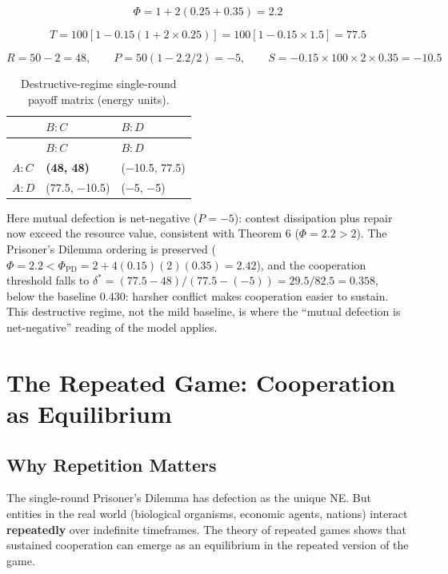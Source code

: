 \documentclass[11pt]{article}
\theoremstyle{plain}
\theoremstyle{definition}
\theoremstyle{remark}
\let\origsection\section
\renewcommand{\section}{\needspace{12\baselineskip}\origsection}
\let\origsubsection\subsection
\renewcommand{\subsection}{\needspace{7\baselineskip}\origsubsection}
\begin{document}
\[\Phi = 1 + 2(0.25 + 0.35) = 2.2\]

\[T = 100[1 - 0.15(1 + 2 \times 0.25)] = 100[1 - 0.15 \times 1.5] = 77.5\]

\[R = 50 - 2 = 48, \qquad P = 50(1 - 2.2/2) = -5, \qquad S = -0.15 \times 100 \times 2 \times 0.35 = -10.5\]

\begin{longtable}[]{@{}lll@{}}
\caption{Destructive-regime single-round payoff matrix (energy
units).}\tabularnewline
\toprule\noalign{}
& \(B: C\) & \(B: D\) \\
\midrule\noalign{}
\endfirsthead
\toprule\noalign{}
& \(B: C\) & \(B: D\) \\
\midrule\noalign{}
\endhead
\bottomrule\noalign{}
\endlastfoot
\(A: C\) & \textbf{(48, 48)} & (−10.5, 77.5) \\
\(A: D\) & (77.5, −10.5) & (−5, −5) \\
\end{longtable}

Here mutual defection is net-negative (\(P = -5\)): contest dissipation
plus repair now exceed the resource value, consistent with Theorem 6
\citep{TC-IV} (\(\Phi = 2.2 > 2\)). The Prisoner's Dilemma ordering is
preserved
(\(\Phi = 2.2 < \Phi_{\text{PD}} = 2 + 4(0.15)(2)(0.35) = 2.42\)), and
the cooperation threshold falls to
\(\delta^* = (77.5 - 48)/(77.5 - (-5)) = 29.5/82.5 = 0.358\), below the
baseline \(0.430\): harsher conflict makes cooperation easier to
sustain. This destructive regime, not the mild baseline, is where the
``mutual defection is net-negative'' reading of the model applies.

\section{The Repeated Game: Cooperation as
Equilibrium}\label{the-repeated-game-cooperation-as-equilibrium}

\subsection{Why Repetition Matters}\label{why-repetition-matters}

The single-round Prisoner's Dilemma has defection as the unique NE. But
entities in the real world (biological organisms, economic agents,
nations) interact \textbf{repeatedly} over indefinite timeframes. The
theory of repeated games \citep{Fudenberg1986} shows that sustained
cooperation can emerge as an equilibrium in the repeated version of the
game.
\end{document}

